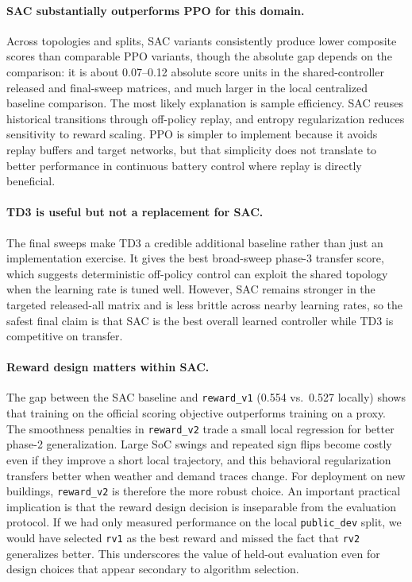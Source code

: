\documentclass{article}
\begin{document}
\paragraph{SAC substantially outperforms PPO for this domain.} Across topologies and splits, SAC variants consistently produce lower composite scores than comparable PPO variants, though the absolute gap depends on the comparison: it is about 0.07--0.12 absolute score units in the shared-controller released and final-sweep matrices, and much larger in the local centralized baseline comparison. The most likely explanation is sample efficiency. SAC reuses historical transitions through off-policy replay, and entropy regularization reduces sensitivity to reward scaling. PPO is simpler to implement because it avoids replay buffers and target networks, but that simplicity does not translate to better performance in continuous battery control where replay is directly beneficial.

\paragraph{TD3 is useful but not a replacement for SAC.} The final sweeps make TD3 a credible additional baseline rather than just an implementation exercise. It gives the best broad-sweep phase-3 transfer score, which suggests deterministic off-policy control can exploit the shared topology when the learning rate is tuned well. However, SAC remains stronger in the targeted released-all matrix and is less brittle across nearby learning rates, so the safest final claim is that SAC is the best overall learned controller while TD3 is competitive on transfer.

\paragraph{Reward design matters within SAC.} The gap between the SAC baseline and \texttt{reward\_v1} (0.554 vs.\ 0.527 locally) shows that training on the official scoring objective outperforms training on a proxy. The smoothness penalties in \texttt{reward\_v2} trade a small local regression for better phase-2 generalization. Large SoC swings and repeated sign flips become costly even if they improve a short local trajectory, and this behavioral regularization transfers better when weather and demand traces change. For deployment on new buildings, \texttt{reward\_v2} is therefore the more robust choice. An important practical implication is that the reward design decision is inseparable from the evaluation protocol. If we had only measured performance on the local \texttt{public\_dev} split, we would have selected \texttt{rv1} as the best reward and missed the fact that \texttt{rv2} generalizes better. This underscores the value of held-out evaluation even for design choices that appear secondary to algorithm selection.
\end{document}
